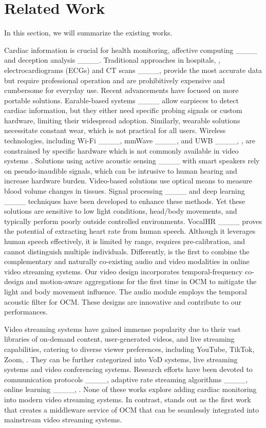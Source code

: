 \section{Related Work}
In this section, we will summarize the existing works.

Cardiac information is crucial for health monitoring, affective computing ____ and deception analysis ____. 
Traditional approaches in hospitals, \eg, electrocardiograms (ECGs) and CT scans ____, provide the most accurate data but require professional operation and are prohibitively expensive and cumbersome for everyday use. Recent advancements have focused on more portable solutions.
Earable-based systems ____ allow earpieces to detect cardiac information, but they either need specific probing signals or custom hardware, limiting their widespread adoption. Similarly, wearable solutions necessitate constant wear, which is not practical for all users. Wireless technologies, including Wi-Fi ____, mmWave ____, and UWB ____, \etc, are constrained by specific hardware which is not commonly available in video systems . 
Solutions using active acoustic sensing ____ with smart speakers rely on pseudo-inaudible signals, which can be intrusive to human hearing and increase hardware burden.
Video-based solutions use optical means to measure blood volume changes in tissues. Signal processing ____ and deep learning ____ techniques have been developed to enhance these methods. Yet these solutions are sensitive to low light conditions, head/body movements, and typically perform poorly outside controlled environments. VocalHR ____ proves the potential of extracting heart rate from human speech. Although it leverages human speech effectively, it is limited by range, requires pre-calibration, and cannot distinguish multiple individuals. 
Differently, \sysname is the first to combine the complementary and naturally co-existing audio and video modalities in online video streaming systems. Our video design incorporates temporal-frequency co-design and motion-aware aggregations for the first time in OCM to mitigate the light and body movement influence. The audio module employs the temporal acoustic filter for OCM. These designs are innovative and contribute to our performances.

 Video streaming systems have gained immense popularity due to their vast libraries of on-demand content, user-generated videos, and live streaming capabilities, catering to diverse viewer preferences, including YouTube, TikTok, Zoom, \etc. They can be further categorized into VoD systems, live streaming systems and video conferencing systems. Research efforts have been devoted to communication protocols ____, adaptive rate streaming algorithms  ____, online learning ____, \etc. None of these works explore adding cardiac monitoring into modern video streaming systems. 
In contrast, \sysname stands out as the first work that creates a middleware service of OCM that can be seamlessly integrated into mainstream video streaming systems.
